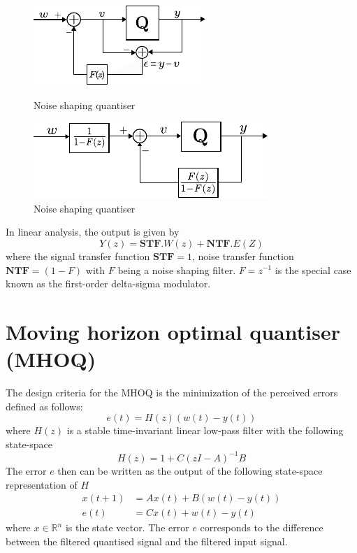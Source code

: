 \documentclass[a4paper]{article}
\begin{document}
\begin{figure}[!h]
	\centering
	\begin{minipage}{0.45\linewidth}
		\centering
		\includegraphics[scale = 1.5]{figures/noise_shaping2.pdf}
		\caption{Noise shaping quantiser}
		\label{fig:dsm}
	\end{minipage}
	\hfil  
	\begin{minipage}{0.45\linewidth}
		\centering
		\includegraphics[scale = 1.5]{figures/noise_shaping_redrawn.pdf}
		\caption{Noise shaping quantiser}
		\label{fig:dsm1}
	\end{minipage}
\end{figure}



In linear analysis, the output is given by 
\begin{equation}
	Y(z) = \textbf{STF}. W(z) + \textbf{NTF} .E(Z)
\end{equation}
where the signal transfer function $\textbf{STF} = 1$, noise transfer function $\textbf{NTF} =  (1-F)$ with $F$ being a noise shaping filter. $F = z^{-1}$ is the special case known as 
the first-order delta-sigma modulator. 

\section{Moving horizon optimal quantiser (MHOQ)}
The design criteria for the MHOQ is the minimization of the perceived errors defined as follows:
\begin{equation}
	e(t) = H(z)(w(t)-y(t))
	\label{eq:error1}
\end{equation}
where  $H(z)$  is  a stable time-invariant linear low-pass filter with the following state-space
\begin{equation}
	\label{eq:filter_statespace}
	H(z) = 1 + C(z I - A)^{-1} B
\end{equation}
The error $e$  then can be written as the output of the following state-space representation of $H$
\begin{equation}
	\begin{aligned}
		x(t+1) &= A x(t) + B (w(t)-y(t))		\\
		e(t) &= Cx(t) + w(t)-y(t)
	\end{aligned}
	\label{eq:statespace1}
\end{equation}
where $x \in \mathbb{R}^{n}$ is the state vector.  The error $e$ corresponds to the difference between the filtered quantised signal and the filtered input signal. 
\end{document}

